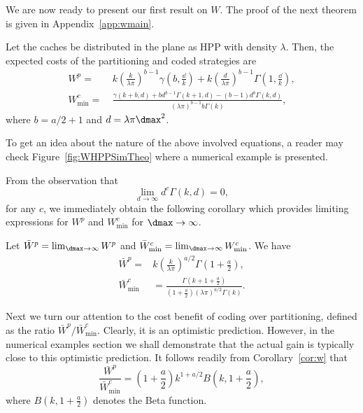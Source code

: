 We are now ready to present our first result on $W$. The proof of the next theorem is given in Appendix~\ref{app:wmain}.
\begin{theorem} \label{th:wmain}
Let the caches be distributed in the plane as HPP with density $\lambda$.
Then, the expected costs of the partitioning and coded strategies are
\begin{align*}
W^p =&\ k\left(\frac{k}{\lambda\pi}\right)^{b-1}\gamma\left(b,\frac{\dd}{k}\right)
 + k\left(\frac{d}{\lambda\pi}\right)^{b-1}\Gamma\left(1,\frac{\dd}{k}\right), \\
W^c_{\mathrm{min}} =&\ \frac{\gamma(k+b,d) + bd^{b-1}\Gamma(k+1,d)-(b-1)d^{b}\Gamma(k,d)}{(\lambda\pi)^{b-1}b\Gamma(k)},
\end{align*}
where $b=a/2+1$ and $d=\lambda\pi\dmax^2$.
\end{theorem}

To get an idea about the nature of the above involved equations, a reader may check Figure~\ref{fig:WHPPSimTheo}
where a numerical example is presented.





From the observation that
\begin{equation}
\lim_{d\to\infty} d^c\Gamma(k,d) = 0,
\end{equation}
for any $c$,
we immediately obtain the following corollary which provides limiting expressions for $W^p$ and $W^c_{\mathrm{min}}$ for $\dmax\to\infty$.
\begin{corollary} \label{cor:w}
Let $\bar W^p = \lim_{\dmax\to\infty} W^p$ and $\bar W^c_{\mathrm{min}} = \lim_{\dmax\to\infty} W^c_{\mathrm{min}}$. We have
\begin{align}
\bar W^p =& k\left(\frac{k}{\lambda\pi}\right)^{a/2}\Gamma\left(1+\frac{a}{2}\right), \\
\bar W^c_{\mathrm{min}} &=  \frac{\Gamma(k+1+\frac{a}{2})}{(1+\frac{a}{2})(\lambda\pi)^{a/2}\Gamma(k)}.
\end{align}
\end{corollary}

Next we turn our attention to the cost benefit of coding over partitioning, defined as the ratio $\bar W^p/\bar W^c_{\mathrm{min}}$.
Clearly, it is an optimistic prediction. However, in the numerical examples section we shall demonstrate that the actual gain is
typically close to this optimistic prediction. It follows readily from Corollary~\ref{cor:w} that
\begin{equation}
\frac{\bar W^p}{\bar W^c_{\mathrm{min}}}  = \left(1+\frac{a}{2}\right) k^{1+a/2}B\left(k,1+\frac{a}{2}\right),
\end{equation}
where $B(k,1+\frac{a}{2})$ denotes the Beta function.


